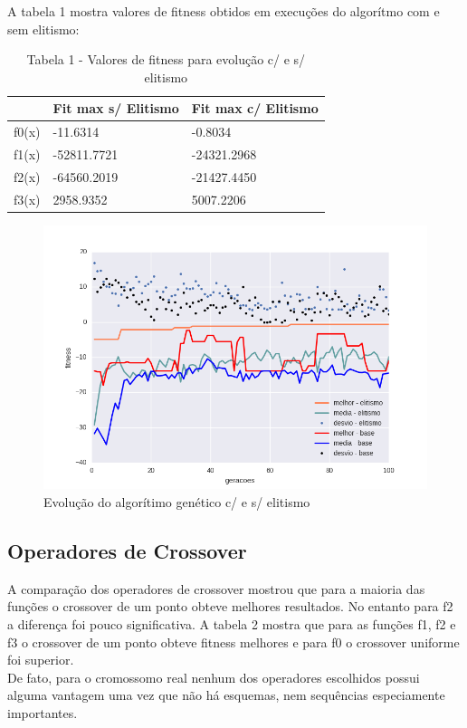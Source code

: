 \documentclass[conference]{IEEEtran}
\begin{document}
A tabela 1 mostra valores de fitness obtidos em execuções do algorítmo
com e sem elitismo:\\


\begin{table}[h]
\begin{tabular}{|l|l|l|}
\hline
      & Fit max s/ Elitismo & Fit max c/ Elitismo \\ \hline
f0(x) & -11.6314            & -0.8034             \\ \hline
f1(x) & -52811.7721         & -24321.2968         \\ \hline
f2(x) & -64560.2019         & -21427.4450         \\ \hline
f3(x) & 2958.9352           & 5007.2206           \\ \hline
\end{tabular}
\caption*{Tabela 1 - Valores de fitness para evolução c/ e s/ elitismo}
\end{table}


\begin{figure}[!t]
\centering
\includegraphics[scale=0.5]{f0_elitism}
\caption{Evolução do algorítimo genético c/ e s/ elitismo}
\end{figure}

\subsection{Operadores de Crossover}
A comparação dos operadores de crossover mostrou que para a maioria das funções 
o crossover de um ponto obteve melhores resultados. No entanto para f2 a diferença foi pouco
significativa. A tabela 2 mostra que para as funções f1, f2 e f3  o crossover de um ponto obteve fitness
melhores e para f0 o crossover uniforme foi superior. \\
De fato, para o cromossomo real nenhum dos operadores escolhidos possui alguma 
vantagem uma vez que não há esquemas, nem sequências especiamente importantes.\\
\end{document}
